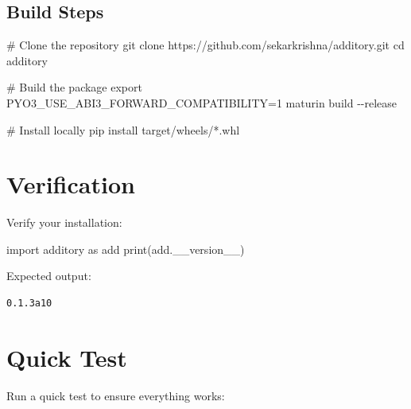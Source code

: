 \documentclass[
  letterpaper,
]{scrbook}
\newenvironment{Shaded}{\begin{snugshade}}{\end{snugshade}}
\newcommand{\AttributeTok}[1]{\textcolor[rgb]{0.40,0.45,0.13}{#1}}
\newcommand{\BuiltInTok}[1]{\textcolor[rgb]{0.00,0.23,0.31}{#1}}
\newcommand{\CommentTok}[1]{\textcolor[rgb]{0.37,0.37,0.37}{#1}}
\newcommand{\ExtensionTok}[1]{\textcolor[rgb]{0.00,0.23,0.31}{#1}}
\newcommand{\FunctionTok}[1]{\textcolor[rgb]{0.28,0.35,0.67}{#1}}
\newcommand{\ImportTok}[1]{\textcolor[rgb]{0.00,0.46,0.62}{#1}}
\newcommand{\NormalTok}[1]{\textcolor[rgb]{0.00,0.23,0.31}{#1}}
\newcommand{\OperatorTok}[1]{\textcolor[rgb]{0.37,0.37,0.37}{#1}}
\newcommand{\PreprocessorTok}[1]{\textcolor[rgb]{0.68,0.00,0.00}{#1}}
\newcommand{\VariableTok}[1]{\textcolor[rgb]{0.07,0.07,0.07}{#1}}
\begin{document}
\subsection{Build Steps}\label{build-steps}

\begin{Shaded}
\begin{Highlighting}[]
\CommentTok{\# Clone the repository}
\FunctionTok{git}\NormalTok{ clone https://github.com/sekarkrishna/additory.git}
\BuiltInTok{cd}\NormalTok{ additory}

\CommentTok{\# Build the package}
\BuiltInTok{export} \VariableTok{PYO3\_USE\_ABI3\_FORWARD\_COMPATIBILITY}\OperatorTok{=}\NormalTok{1}
\ExtensionTok{maturin}\NormalTok{ build }\AttributeTok{{-}{-}release}

\CommentTok{\# Install locally}
\ExtensionTok{pip}\NormalTok{ install target/wheels/}\PreprocessorTok{*}\NormalTok{.whl}
\end{Highlighting}
\end{Shaded}

\section{Verification}\label{verification}

Verify your installation:

\begin{Shaded}
\begin{Highlighting}[]
\ImportTok{import}\NormalTok{ additory }\ImportTok{as}\NormalTok{ add}
\BuiltInTok{print}\NormalTok{(add.\_\_version\_\_)}
\end{Highlighting}
\end{Shaded}

Expected output:

\begin{verbatim}
0.1.3a10
\end{verbatim}

\section{Quick Test}\label{quick-test}

Run a quick test to ensure everything works:
\end{document}
